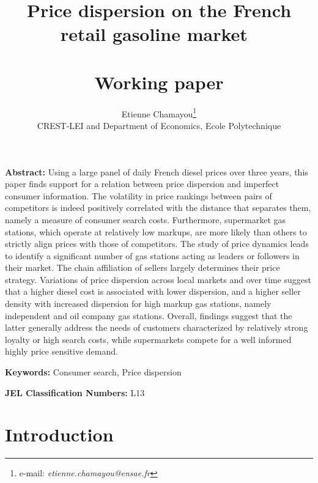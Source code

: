 \documentclass[english]{article}
\begin{document}
\title{Price dispersion on the French retail gasoline market\ \\ \ \\Working paper}
\author{Etienne Chamayou\thanks{e-mail:
\textit{etienne.chamayou@ensae.fr}}\medskip\\{\normalsize CREST-LEI and Department of Economics, Ecole Polytechnique }}
\maketitle

\sloppy%

\onehalfspacing

\textbf{Abstract:}
Using a large panel of daily French diesel prices over three years, this paper finds support for a relation between price dispersion and imperfect consumer information. The volatility in price rankings between pairs of competitors is indeed positively correlated with the distance that separates them, namely a measure of consumer search costs. Furthermore, supermarket gas stations, which operate at relatively low markups, are more likely than others to strictly align prices with those of competitors. The study of price dynamics leads to identify a significant number of gas stations acting as leaders or followers in their market. The chain affiliation of sellers largely determines their price strategy. Variations of price dispersion across local markets and over time suggest that a higher diesel cost is associated with lower dispersion, and a higher seller density with increased dispersion for high markup gas stations, namely independent and oil company gas stations. Overall, findings suggest that the latter generally address the needs of customers characterized by relatively strong loyalty or high search costs, while supermarkets compete for a well informed highly price sensitive demand.

\strut

\textbf{Keywords:} Consumer search, Price dispersion

\strut

\textbf{JEL Classification Numbers:} L13

\pagebreak%

\section{Introduction}
\end{document}
